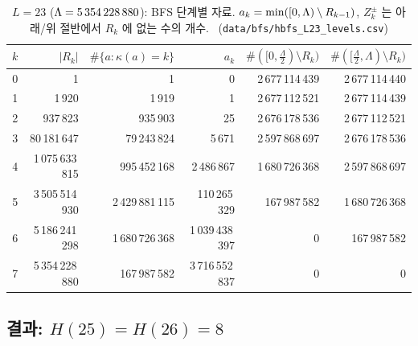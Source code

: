 \begin{table}[ht]\centering\small
\begin{tabular}{rrrrrr}
\toprule
$k$ & $|R_k|$ & $\#\{a:\kappa(a)=k\}$ & $a_k$ & $\#([0,\frac{\Lambda}{2})\setminus R_k)$ & $\#([\frac{\Lambda}{2},\Lambda)\setminus R_k)$\\
\midrule
0 & 1 & 1 & 0 & 2\,677\,114\,439 & 2\,677\,114\,440\\
1 & 1\,920 & 1\,919 & 1 & 2\,677\,112\,521 & 2\,677\,114\,439\\
2 & 937\,823 & 935\,903 & 25 & 2\,676\,178\,536 & 2\,677\,112\,521\\
3 & 80\,181\,647 & 79\,243\,824 & 5\,671 & 2\,597\,868\,697 & 2\,676\,178\,536\\
4 & 1\,075\,633\,815 & 995\,452\,168 & 2\,486\,867 & 1\,680\,726\,368 & 2\,597\,868\,697\\
5 & 3\,505\,514\,930 & 2\,429\,881\,115 & 110\,265\,329 & 167\,987\,582 & 1\,680\,726\,368\\
6 & 5\,186\,241\,298 & 1\,680\,726\,368 & 1\,039\,438\,397 & 0 & 167\,987\,582\\
7 & 5\,354\,228\,880 & 167\,987\,582 & 3\,716\,552\,837 & 0 & 0\\
\bottomrule
\end{tabular}
\caption{$L=23$ ($\Lambda=5\,354\,228\,880$): BFS 단계별 자료. $a_k=\min([0,\Lambda)\setminus R_{k-1})$,
$Z^\pm_k$ 는 아래/위 절반에서 $R_k$ 에 없는 수의 개수. \NUMERIC\ (\texttt{data/bfs/hbfs\_L23\_levels.csv})}\label{NUM:tab-L23}
\end{table}

\subsection{결과: $H(25)=H(26)=8$}\label{NUM:ssec-H25}

